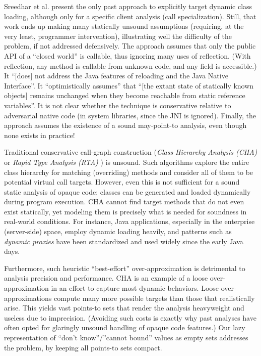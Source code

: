 Sreedhar et al. \cite{Sreedhar:2000:FIO:349299.349326} present the
only past approach to explicitly target dynamic class loading,
although only for a specific client analysis (call
specialization). Still, that work ends up making many statically
unsound assumptions (requiring, at the very least, programmer
intervention), illustrating well the difficulty of the problem, if not
addressed defensively. The approach assumes that only the public API
of a ``closed world'' is callable, thus ignoring many uses of
reflection. (With reflection, any method is callable from unknown
code, and any field is accessible.) It ``[does] not address the Java
features of reloading and the Java Native Interface''. It
``optimistically assumes'' that ``[the extant state of statically
  known objects] remains unchanged when they become reachable from
static reference variables''. It is not clear whether the technique is
conservative relative to adversarial native code (in system libraries,
since the JNI is ignored). Finally, the approach assumes the existence
of a sound may-point-to analysis, even though none exists in practice!

Traditional conservative call-graph construction (\emph{Class
  Hierarchy Analysis (CHA)} \cite{Dean:1995:OOP:646153.679523} or
\emph{Rapid Type Analysis (RTA)} \cite{bacon-sweeney-oopsla96}) is
unsound.  Such algorithms explore the entire class hierarchy for
matching (overriding) methods and consider all of them to be potential
virtual call targets. However, even this is not sufficient for a sound static
analysis of opaque code: classes can be generated and loaded
dynamically during program execution. CHA cannot find target methods
that do not even exist statically, yet modeling them is precisely what
is needed for soundness in real-world conditions. For instance, Java
applications, especially in the enterprise (server-side) space, employ
dynamic loading heavily, and patterns such as \emph{dynamic proxies}
have been standardized and used widely since the early Java days.

Furthermore, such heuristic ``best-effort'' over-approximation is
detrimental to analysis precision and performance. CHA is an example
of a loose over-approximation in an effort to capture most dynamic
behaviors.
Loose over-approximations compute many more possible targets than
those that realistically arise. This yields vast points-to sets that
render the analysis heavyweight and useless due to imprecision.
(Avoiding such costs is exactly why past analyses have often opted for glaringly
unsound handling of opaque code features.)
Our lazy representation of ``don't know''/''cannot bound'' values as empty
sets addresses the problem, by keeping all points-to sets compact.


